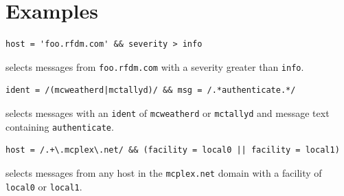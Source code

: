 \section{Examples}
\begin{verbatim}
host = 'foo.rfdm.com' && severity > info
\end{verbatim}
selects messages from \texttt{foo.rfdm.com} with a severity greater
than \texttt{info}.

\begin{verbatim}
ident = /(mcweatherd|mctallyd)/ && msg = /.*authenticate.*/
\end{verbatim}
selects messages with an \texttt{ident} of \texttt{mcweatherd} or
\texttt{mctallyd} and message text containing \texttt{authenticate}.

\begin{verbatim}
host = /.+\.mcplex\.net/ && (facility = local0 || facility = local1)
\end{verbatim}

selects messages from any host in the \texttt{mcplex.net} domain with
a facility of \texttt{local0} or \texttt{local1}.
